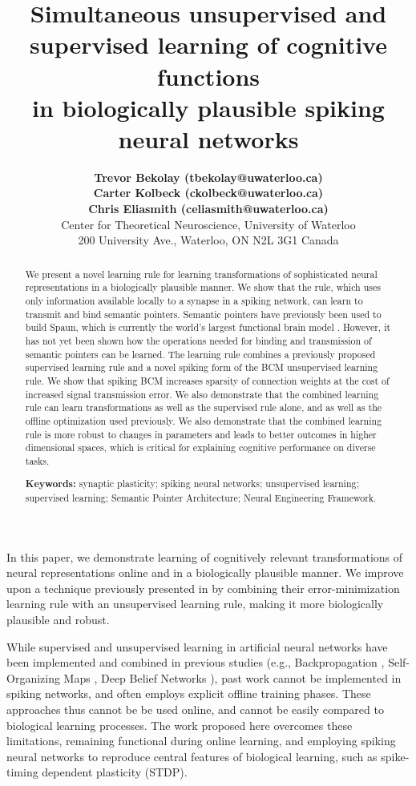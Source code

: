 \documentclass[10pt,letterpaper]{article}
\title{Simultaneous unsupervised and supervised learning of
  cognitive functions \\ in biologically plausible spiking
  neural networks}
\author{{\large \bf Trevor Bekolay (tbekolay@uwaterloo.ca)} \\
  {\large \bf Carter Kolbeck (ckolbeck@uwaterloo.ca)} \\
  {\large \bf Chris Eliasmith (celiasmith@uwaterloo.ca)} \\
  Center for Theoretical Neuroscience, University of Waterloo \\
  200 University Ave., Waterloo, ON N2L 3G1 Canada}
\begin{document}
\maketitle

\begin{abstract}
  We present a novel learning rule for learning
  transformations of sophisticated neural representations
  in a biologically plausible manner.
  We show that the rule,
  which uses only information available locally
  to a synapse in a spiking network,
  can learn to transmit and bind semantic pointers.
  Semantic pointers have previously been used to build Spaun,
  which is currently the world's largest functional brain model
  \cite{Eliasmith2012}.
  However, it has not yet been shown
  how the operations needed for binding and transmission
  of semantic pointers can be learned.
  The learning rule combines a previously
  proposed supervised learning rule
  and a novel spiking form
  of the BCM unsupervised learning rule.
  We show that spiking BCM increases sparsity
  of connection weights
  at the cost of increased signal transmission error.
  We also demonstrate that the combined learning rule
  can learn transformations
  as well as the supervised rule alone,
  and as well as the offline optimization used previously.
  We also demonstrate that the combined learning rule
  is more robust to changes in parameters
  and leads to better outcomes
  in higher dimensional spaces, which is critical for
  explaining cognitive performance on diverse tasks.

  \textbf{Keywords:} synaptic plasticity; spiking neural networks;
  unsupervised learning; supervised learning;
  Semantic Pointer Architecture; Neural Engineering Framework.
\end{abstract}

In this paper, we demonstrate learning of cognitively relevant
transformations of neural representations online and in
a biologically plausible manner.
We improve upon a technique previously presented in
 by combining their error-minimization learning rule
with an unsupervised learning rule,
making it more biologically plausible and robust.

While supervised and unsupervised learning
in artificial neural networks have been
implemented and combined in previous studies
(e.g., Backpropagation \cite{Rumelhart1986},
Self-Organizing Maps \cite{Kohonen1982},
Deep Belief Networks \cite{Hinton2006}),
past work cannot be implemented in spiking networks,
and often employs explicit offline training phases.
These approaches thus cannot be be used online,
and cannot be easily compared to biological learning processes.
The work proposed here overcomes these limitations,
remaining functional during online learning,
and employing spiking neural networks
to reproduce central features of biological learning,
such as spike-timing dependent plasticity (STDP).
\end{document}
